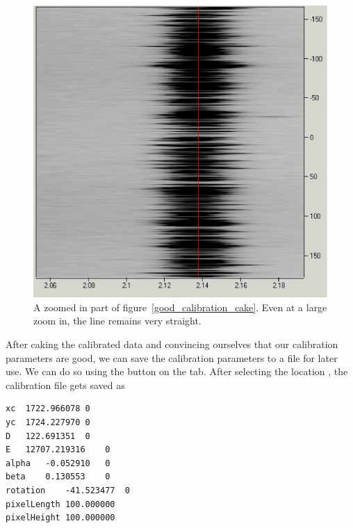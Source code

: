 \begin{figure}
    \centering
    \includegraphics[scale=.75]{figures/good_calibration_cake_zoom.eps}
    \caption{A zoomed in part of figure~\ref{good_calibration_cake}. 
    Even at a large zoom in, the line remains very straight.}
    \label{good_calibration_cake_zoom}
\end{figure}

After caking the calibrated data and convincing ourselves that
our calibration parameters are good, we can save the calibration
parameters to a file for later use. We can do so using the
 button on the  tab.
After selecting the location , the
calibration file gets saved as
\begin{lstlisting}[caption={'The Calibration Parameters File'}]
xc	1722.966078	0
yc	1724.227970	0
D	122.691351	0
E	12707.219316	0
alpha	-0.052910	0
beta	0.130553	0
rotation	-41.523477	0
pixelLength	100.000000
pixelHeight	100.000000
\end{lstlisting}

